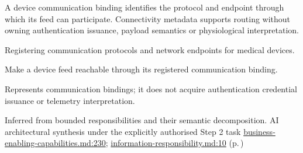 A device communication binding identifies the protocol and endpoint through which its feed can participate. Connectivity metadata supports routing without owning authentication issuance, payload semantics or physiological interpretation.



Registering communication protocols and network endpoints for medical devices.



Make a device feed reachable through its registered communication binding.



Represents communication bindings; it does not acquire authentication credential issuance or telemetry interpretation.


Inferred from bounded responsibilities and their semantic decomposition. AI architectural synthesis under the explicitly authorised Step 2 task \hyperref[evidence:e01893359d483acf]{business-enabling-capabilities.md:230}; \hyperref[evidence:be61392fefb4bb10]{information-responsibility.md:10}
 (p.\,\pageref{cap:bec-reviewed-device-oa-m-metadata-management})
